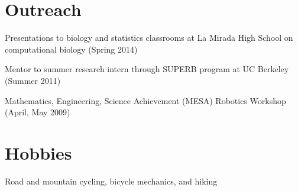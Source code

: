 \documentclass[margin,line]{res}
\begin{document}
\begin{resume}
\section{\sc Outreach}
Presentations to biology and statistics classrooms at La Mirada High School on
computational biology (Spring 2014)

Mentor to summer research intern through SUPERB program at UC Berkeley (Summer
2011)


Mathematics, Engineering, Science Achievement (MESA) Robotics Workshop
(April, May 2009)
\vspace{-.25cm}

\section{\sc Hobbies}
Road and mountain cycling, bicycle mechanics, and hiking
\end{resume}
\end{document}
